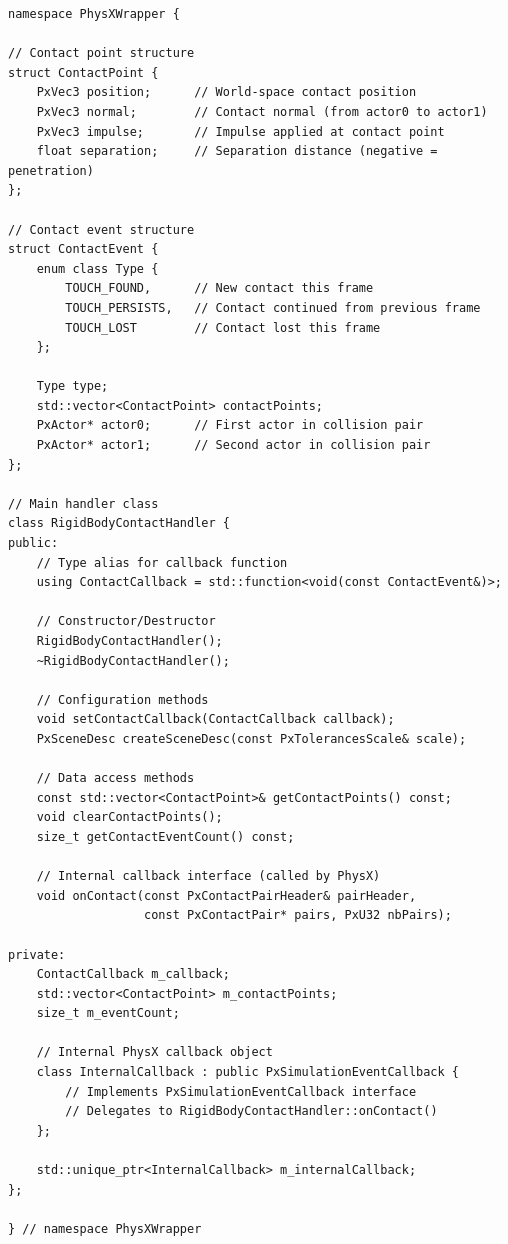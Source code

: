 \begin{lstlisting}[style=cpp, caption=RigidBodyContactHandler Conceptual Interface]
namespace PhysXWrapper {

// Contact point structure
struct ContactPoint {
    PxVec3 position;      // World-space contact position
    PxVec3 normal;        // Contact normal (from actor0 to actor1)
    PxVec3 impulse;       // Impulse applied at contact point
    float separation;     // Separation distance (negative = penetration)
};

// Contact event structure
struct ContactEvent {
    enum class Type {
        TOUCH_FOUND,      // New contact this frame
        TOUCH_PERSISTS,   // Contact continued from previous frame
        TOUCH_LOST        // Contact lost this frame
    };

    Type type;
    std::vector<ContactPoint> contactPoints;
    PxActor* actor0;      // First actor in collision pair
    PxActor* actor1;      // Second actor in collision pair
};

// Main handler class
class RigidBodyContactHandler {
public:
    // Type alias for callback function
    using ContactCallback = std::function<void(const ContactEvent&)>;

    // Constructor/Destructor
    RigidBodyContactHandler();
    ~RigidBodyContactHandler();

    // Configuration methods
    void setContactCallback(ContactCallback callback);
    PxSceneDesc createSceneDesc(const PxTolerancesScale& scale);

    // Data access methods
    const std::vector<ContactPoint>& getContactPoints() const;
    void clearContactPoints();
    size_t getContactEventCount() const;

    // Internal callback interface (called by PhysX)
    void onContact(const PxContactPairHeader& pairHeader,
                   const PxContactPair* pairs, PxU32 nbPairs);

private:
    ContactCallback m_callback;
    std::vector<ContactPoint> m_contactPoints;
    size_t m_eventCount;

    // Internal PhysX callback object
    class InternalCallback : public PxSimulationEventCallback {
        // Implements PxSimulationEventCallback interface
        // Delegates to RigidBodyContactHandler::onContact()
    };

    std::unique_ptr<InternalCallback> m_internalCallback;
};

} // namespace PhysXWrapper
\end{lstlisting}

